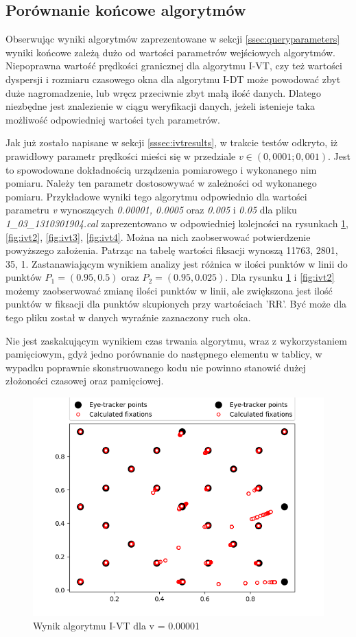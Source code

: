 \subsection{Porównanie końcowe algorytmów}
\label{ssec:compalgorithms}
Obserwując wyniki algorytmów zaprezentowane w sekcji \ref{ssec:queryparameters} wyniki końcowe zależą dużo od wartości parametrów wejściowych algorytmów. Niepoprawna wartość prędkości granicznej dla algorytmu I-VT, czy też wartości dyspersji i rozmiaru czasowego okna dla algorytmu I-DT może powodować zbyt duże nagromadzenie, lub wręcz przeciwnie zbyt małą ilość danych. Dlatego niezbędne jest znalezienie w ciągu weryfikacji danych, jeżeli istenieje taka możliwość odpowiedniej wartości tych parametrów.\par
Jak już zostało napisane w sekcji \ref{sssec:ivtresults}, w trakcie testów odkryto, iż prawidłowy parametr prędkości mieści się w przedziale $v \in (0,0001;0,001)$. Jest to spowodowane dokładnością urządzenia pomiarowego i wykonanego nim pomiaru. Należy ten parametr dostosowywać w zależności od wykonanego pomiaru. Przykładowe wyniki tego algorytmu odpowiednio dla wartości parametru \emph{v} wynoszących \emph{0.00001, 0.0005} oraz \emph{0.005} i \emph{0.05} dla pliku \emph{1\_03\_1310301904.cal} zaprezentowano w odpowiedniej kolejności na rysunkach \ref{fig:ivt1}, \ref{fig:ivt2}, \ref{fig:ivt3}, \ref{fig:ivt4}. Można na nich zaobserwować potwierdzenie powyższego założenia. Patrząc na tabelę  wartości fiksacji wynoszą 11763, 2801, 35, 1. Zastanawiającym wynikiem analizy jest różnica w ilości punktów w linii do punktów $P_1 = (0.95,0.5)$ oraz $P_2 = (0.95, 0.025)$. Dla rysunku \ref{fig:ivt1} i \ref{fig:ivt2} możemy zaobserwować zmianę ilości punktów w linii, ale zwiększona jest ilość punktów w fiksacji dla punktów skupionych przy wartościach 'RR'. Być może dla tego pliku został w danych wyraźnie zaznaczony ruch oka.\par
Nie jest zaskakującym wynikiem czas trwania algorytmu, wraz z wykorzystaniem pamięciowym, gdyż jedno porównanie do następnego elementu w tablicy, w wypadku poprawnie skonstruowanego kodu nie powinno stanowić dużej złożoności czasowej oraz pamięciowej.
\begin{figure}[H]
    \centering
    \captionsetup{justification=centering,margin=2cm}
    \includegraphics[width=0.8\linewidth]{resources/ivtresults/file1.png}
    \caption{Wynik algorytmu I-VT dla v = 0.00001}
    \label{fig:ivt1}
\end{figure}
